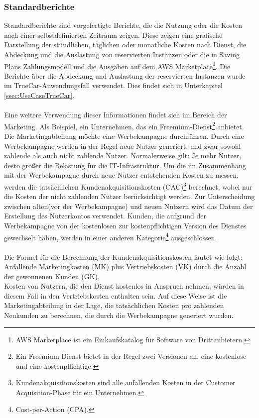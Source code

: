 \subsubsection*{Standardberichte}
Standardberichte sind vorgefertigte Berichte, die die Nutzung oder die Kosten nach einer selbstdefinierten Zeitraum zeigen. Diese zeigen eine grafische Darstellung der stündlichen, täglichen oder monatliche Kosten nach Dienst, die Abdeckung und die Auslastung von reservierten Instanzen oder die in Saving Plans Zahlungsmodell und die Ausgaben auf dem AWS Marketplace\footnote{{AWS Marketplace ist ein Einkaufskatalog für Software von Drittanbietern\cite{AMZ34}.}}. Die Berichte über die Abdeckung und Auslastung der reservierten Instanzen wurde im TrueCar-Anwendungsfall verwendet. Dies findet sich in Unterkapitel \ref{ssec:UseCaseTrueCar}.
\\\\
Eine weitere Verwendung dieser Informationen findet sich im Bereich der Marketing. Als Beispiel, ein Unternehmen, das ein Freemium-Dienst\footnote{Ein Freemium-Dienst bietet in der Regel zwei Versionen an, eine kostenlose und eine kostenpflichtige\cite{MAR2}.} anbietet. Die Marketingabteilung möchte eine Werbekampagne durchführen. Durch eine Werbekampagne werden in der Regel neue Nutzer generiert, und zwar sowohl zahlende als auch nicht zahlende Nutzer. Normalerweise gilt: Je mehr Nutzer, desto größer die Belastung für die IT-Infrastruktur. Um die im Zusammenhang mit der Werbekampagne durch neue Nutzer entstehenden Kosten zu messen, werden die tatsächlichen Kundenakquisitionskosten (CAC)\footnote{Kundenakquisitionskosten sind alle anfallenden Kosten in der Customer Acquisition-Phase für ein Unternehmen\cite{MAR1}.} berechnet, wobei nur die Kosten der nicht zahlenden Nutzer berücksichtigt werden. Zur Unterscheidung zwischen alten(vor der Werbekampagne) und neuen Nutzern wird das Datum der Erstellung des Nutzerkontos verwendet. Kunden, die aufgrund der Werbekampagne von der kostenlosen zur kostenpflichtigen Version des Dienstes gewechselt haben, werden in einer anderen Kategorie\footnote{Cost-per-Action (CPA)\cite{MAR3}.} ausgeschlossen.
\\\\ 
Die Formel für die Berechnung der Kundenakquisitionskosten lautet wie folgt:\\
Anfallende Marketingkosten (MK) plus Vertriebskosten (VK) durch die Anzahl der gewonnenen Kunden (GK).\\
Kosten von Nutzern, die den Dienst kostenlos in Anspruch nehmen, würden in diesem Fall in den Vertriebskosten enthalten sein. Auf diese Weise ist die Marketingabteilung in der Lage, die tatsächlichen Kosten pro zahlenden Neukunden zu berechnen, die durch die Werbekampagne generiert wurden.  

